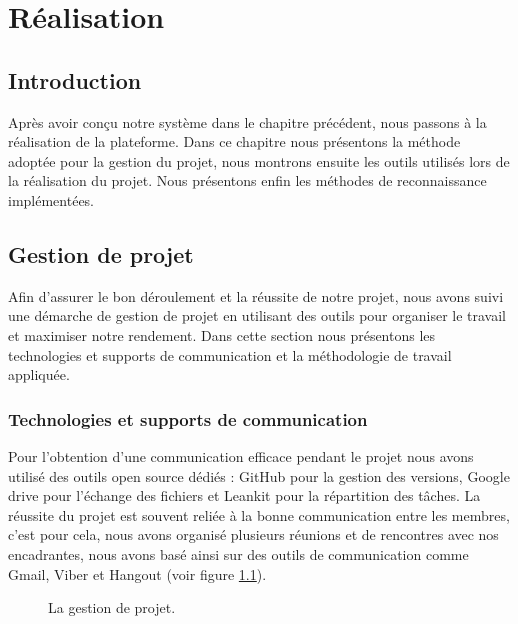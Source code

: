 \chapter{Réalisation}
\section{Introduction}
Après avoir conçu notre système dans le chapitre précédent, nous passons à la réalisation de la plateforme.
Dans ce chapitre nous présentons la méthode adoptée pour la gestion du
projet, nous montrons ensuite les outils utilisés lors de la réalisation du projet. Nous présentons enfin
les méthodes de reconnaissance implémentées.
\section{Gestion de projet}
Afin d'assurer le bon déroulement et la réussite de notre projet, nous avons suivi une démarche de gestion de projet en utilisant des outils pour organiser le travail et maximiser notre rendement. Dans cette section nous présentons les technologies et supports de communication et la méthodologie de travail appliquée.
\subsection{Technologies et supports de communication}
Pour l'obtention d’une communication efficace pendant le projet nous avons utilisé des outils open source dédiés : GitHub pour la gestion des versions, Google drive pour l’échange des fichiers et Leankit pour la répartition des tâches. 
La réussite du projet est souvent reliée à la bonne communication entre les membres, c'est pour cela, nous avons organisé plusieurs réunions et de rencontres avec nos encadrantes, nous avons basé ainsi sur des outils de communication comme Gmail, Viber et Hangout (voir figure \ref{fig:demarche}).

\begin{figure}[H]
	\centering
	\caption{La gestion de projet.}
	\label{fig:demarche}
\end{figure}
